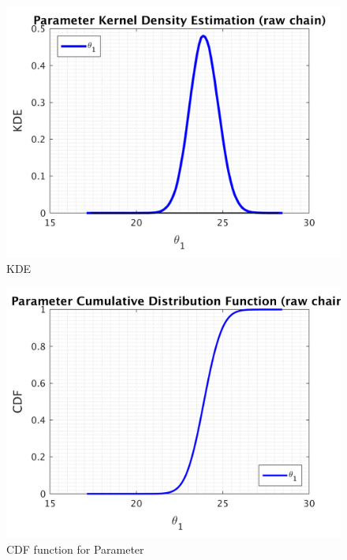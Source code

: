 \begin{figure}[H]
  
  \centering
   \includegraphics[scale=0.75]{100_results/outputData_1000/simple_ip_kde_raw}
   \caption{ KDE }
\end{figure}

\begin{figure}[H]
  
  \centering
   \includegraphics[scale=0.75]{100_results/outputData_1000/simple_ip_cdf_raw}
   \caption{CDF function for Parameter }
\end{figure}



